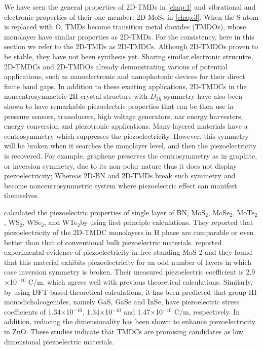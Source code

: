 We have seen the general properties of 2D-TMDs in \autoref{chap:1} and vibrational and electronic properties of their one member: 2D-MoS$_2$ in \autoref{chap:3}. When the S atom is replaced with O, TMDs become transition metal dioxides (TMDOs), whose monolayer have similar properties as 2D-TMDs. For the consistency, here in this section we refer to the 2D-TMDs as 2D-TMDCs. Although 2D-TMDOs proven to be stable, they have not been synthesis yet. Sharing similar electronic strucutre, 2D-TMDCs and 2D-TMDOs already demonstrating various of potential applications, such as nanoelectronic and nanophotonic devices for their direct finite band gaps\cite{Jariwala2014,Wang2012}. In addition to these exciting applications, 2D-TMDCs in the noncentrosymmetric 2H crystal structure with $D_{3h}$ symmetry have also been shown to have remarkable piezoelectric properties that can be then use in pressure sensors,  transducers,  high voltage generators,  nar energy harvesters, energy conversion and piezotronic applications. Many layered materials have a centrosymmetry which suppresses the piezoelectricity. However, this symmetry will be broken when it searches the monolayer level, and then the piezoelectricity is recovered. For example, graphene preserves the centrosymmetry as in graphite, or inversion symmetry, due to its non-polar nature thus it does not display piezoelectricity; Whereas 2D-BN and 2D-TMDs break such symmetry and become noncentrosymmetric system where piezoelectric effect can manifest themselves. 

\citet{Duerloo2012} calculated the piezoelectric properties of single layer of BN, MoS$_2$, MoSe$_2$, MoTe$_2$, WS$_2$, WSe$_2$, and WTe$_2$by using first principle calculations. They reported that piezoelectricity of the 2D-TMDC monolayers in H phase are comparable or even better than that of conventional bulk piezoelectric materials. \citet{Zhu2015} reported 
experimental evidence of piezoelectricity in free-standing MoS 2 and they found that this material exhibits piezoelectricity for an odd number of layers in which case inversion symmetry is broken. Their measured piezoelectric coefficient is 2.9$\times$10$^{-10}$ C/m, which agrees well with previous theoretical calculations\cite{Duerloo2012}.  Similarly, by using DFT based theoretical calculations, it has been predicted that group III monodichalcogenides, namely GaS, GaSe and InSe, have piezoelectric stress coefficients of 1.34$\times$10$^{-10}$, 1.34$\times$10$^{-10}$ and 1.47$\times$10$^{-10}$ C/m, respectively\cite{Li2015a}.  In addition, reducing the dimensionality has been shown to enhance piezoelectricity in ZnO\cite{Xiang2006}. These studies indicate that TMDCs are promising candidates as low dimensional piezoelectric materials. 

